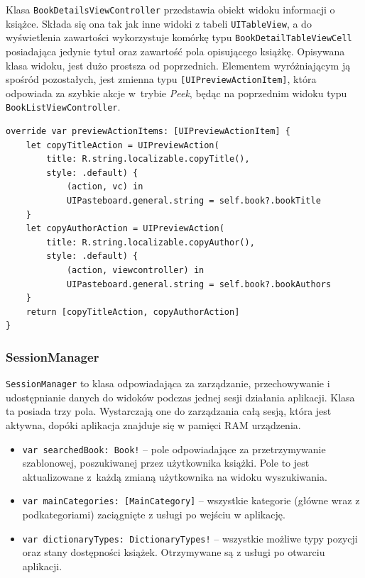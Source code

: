 \documentclass[twoside]{projektInzynierskiMS}
\begin{document}
Klasa \verb`BookDetailsViewController` przedstawia obiekt widoku informacji o książce. Składa się ona tak jak inne widoki z tabeli \verb`UITableView`, a do wyświetlenia zawartości wykorzystuje komórkę typu \verb`BookDetailTableViewCell` posiadająca jedynie tytuł oraz zawartość pola opisującego książkę. Opisywana klasa widoku, jest dużo prostsza od poprzednich. Elementem wyróżniającym ją spośród pozostałych, jest zmienna typu \verb`[UIPreviewActionItem]`, która odpowiada za szybkie akcje w~trybie \textit{Peek}, będąc na poprzednim widoku typu \verb`BookListViewController`.
\begin{verbatim}
override var previewActionItems: [UIPreviewActionItem] {
    let copyTitleAction = UIPreviewAction(
        title: R.string.localizable.copyTitle(),
        style: .default) {
            (action, vc) in
            UIPasteboard.general.string = self.book?.bookTitle
    }
    let copyAuthorAction = UIPreviewAction(
        title: R.string.localizable.copyAuthor(),
        style: .default) {
            (action, viewcontroller) in
            UIPasteboard.general.string = self.book?.bookAuthors
    }
    return [copyTitleAction, copyAuthorAction]
}
\end{verbatim} 


\subsubsection{SessionManager}

\verb`SessionManager` to klasa odpowiadająca za zarządzanie, przechowywanie i udostępnianie danych do widoków podczas jednej sesji działania aplikacji. Klasa ta posiada trzy pola. Wystarczają one do zarządzania całą sesją, która jest aktywna, dopóki aplikacja znajduje się w pamięci RAM urządzenia.
\begin{itemize}
\item \verb`var searchedBook: Book!` -- pole odpowiadające za przetrzymywanie szablonowej, poszukiwanej przez użytkownika książki. Pole to jest aktualizowane z~każdą zmianą użytkownika na widoku wyszukiwania.
\item \verb`var mainCategories: [MainCategory]` -- wszystkie kategorie (główne wraz z podkategoriami) zaciągnięte z usługi po wejściu w aplikację.
\item \verb`var dictionaryTypes: DictionaryTypes!` -- wszystkie możliwe typy pozycji oraz stany dostępności książek. Otrzymywane są z usługi po otwarciu aplikacji.
\end{itemize}
\end{document}
